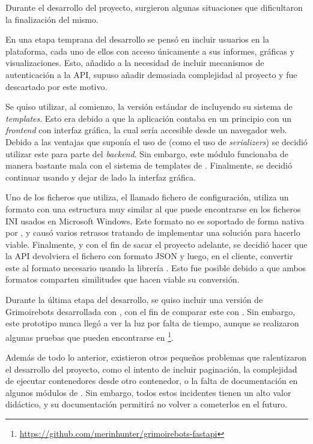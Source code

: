 Durante el desarrollo del proyecto, surgieron algunas situaciones que dificultaron la finalización del mismo.

En una etapa temprana del desarrollo se pensó en incluir usuarios en la plataforma, cada uno de ellos con acceso únicamente a sus informes, gráficas y visualizaciones. Esto, añadido a la necesidad de incluir mecanismos de autenticación a la API, supuso añadir demasiada complejidad al proyecto y fue descartado por este motivo.

Se quiso utilizar, al comienzo, la versión estándar de  incluyendo su sistema de \emph{templates}. Esto era debido a que la aplicación contaba en un principio con un \emph{frontend} con interfaz gráfica, la cual sería accesible desde un navegador web. Debido a las ventajas que suponía el uso de  (como el uso de \emph{serializers}) se decidió utilizar este para parte del \emph{backend}. Sin embargo, este módulo funcionaba de manera bastante mala con el sistema de templates de . Finalmente, se decidió continuar usando  y dejar de lado la interfaz gráfica.

Uno de los ficheros que  utiliza, el llamado fichero de configuración, utiliza un formato con una estructura muy similar al que puede encontrarse en los ficheros INI usados en Microsoft Windows. Este formato no es soportado de forma nativa por , y causó varios retrasos tratando de implementar una solución para hacerlo viable. Finalmente, y con el fin de sacar el proyecto adelante, se decidió hacer que la API devolviera el fichero con formato JSON y luego, en el cliente, convertir este al formato necesario usando la librería . Esto fue posible debido a que ambos formatos comparten similitudes que hacen viable su conversión.

Durante la última etapa del desarrollo, se quiso incluir una versión de Grimoirebots desarrollada con , con el fin de comparar este con . Sin embargo, este prototipo nunca llegó a ver la luz por falta de tiempo, aunque se realizaron algunas pruebas que pueden encontrarse en \footnote{\url{https://github.com/merinhunter/grimoirebots-fastapi}}.

Además de todo lo anterior, existieron otros pequeños problemas que ralentizaron el desarrollo del proyecto, como el intento de incluir paginación, la complejidad de ejecutar contenedores desde otro contenedor, o la falta de documentación en algunos módulos de . Sin embargo, todos estos incidentes tienen un alto valor didáctico, y su documentación permitirá no volver a cometerlos en el futuro.

